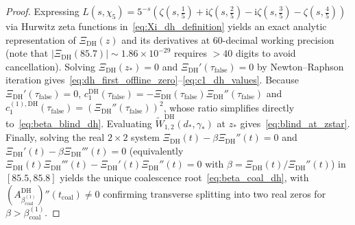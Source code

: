\documentclass[11pt,reqno]{amsart}
\theoremstyle{definition}
\theoremstyle{remark}
\numberwithin{equation}{section}
\newcommand{\ii}{\mathrm{i}}
\begin{document}
\begin{proof}
Expressing $L(s, \chi_5) = 5^{-s}(\zeta(s, \frac{1}{5}) + \ii\zeta(s, \frac{2}{5}) - \ii\zeta(s, \frac{3}{5}) - \zeta(s, \frac{4}{5}))$ via Hurwitz zeta functions in~\eqref{eq:Xi_dh_definition} yields an exact analytic representation of $\Xi_{\mathrm{DH}}(z)$ and its derivatives at $60$-decimal working precision (note that $|\Xi_{\mathrm{DH}}(85.7)| \sim 1.86 \times 10^{-29}$ requires $> 40$ digits to avoid cancellation). Solving $\Xi_{\mathrm{DH}}(z_*) = 0$ and $\Xi_{\mathrm{DH}}'(\tau_{\mathrm{false}}) = 0$ by Newton--Raphson iteration gives~\eqref{eq:dh_first_offline_zero}--\eqref{eq:c1_dh_values}. Because $\Xi_{\mathrm{DH}}'(\tau_{\mathrm{false}}) = 0$, $c_1^{\mathrm{DH}}(\tau_{\mathrm{false}}) = -\Xi_{\mathrm{DH}}(\tau_{\mathrm{false}})\Xi_{\mathrm{DH}}''(\tau_{\mathrm{false}})$ and $c_1^{(1),\mathrm{DH}}(\tau_{\mathrm{false}}) = (\Xi_{\mathrm{DH}}''(\tau_{\mathrm{false}}))^2$, whose ratio simplifies directly to~\eqref{eq:beta_blind_dh}. Evaluating $\widetilde{W}_{1,2}^{\mathrm{DH}}(d_*, \gamma_*)$ at $z_*$ gives~\eqref{eq:blind_at_zstar}. Finally, solving the real $2 \times 2$ system $\Xi_{\mathrm{DH}}(t) - \beta\Xi_{\mathrm{DH}}''(t) = 0$ and $\Xi_{\mathrm{DH}}'(t) - \beta\Xi_{\mathrm{DH}}'''(t) = 0$ (equivalently $\Xi_{\mathrm{DH}}(t)\Xi_{\mathrm{DH}}'''(t) - \Xi_{\mathrm{DH}}'(t)\Xi_{\mathrm{DH}}''(t) = 0$ with $\beta = \Xi_{\mathrm{DH}}(t)/\Xi_{\mathrm{DH}}''(t)$) in $[85.5, 85.8]$ yields the unique coalescence root~\eqref{eq:beta_coal_dh}, with $(A_{\beta_{\mathrm{coal}}^{(1)}}^{\mathrm{DH}})''(t_{\mathrm{coal}}) \neq 0$ confirming transverse splitting into two real zeros for $\beta > \beta_{\mathrm{coal}}^{(1)}$.
\end{proof}
\end{document}
